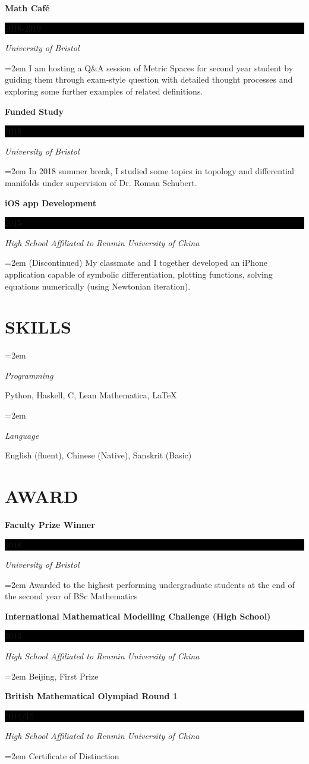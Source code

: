\documentclass[paper=a4,fontsize=11pt]{scrartcl} %
\newlength{\spacebox}
\newcommand{\sepspace}{\vspace*{1em}}		%
\newcommand{\NewPart}[1]{\section*{\uppercase{#1}}}
\newcommand{\PersonalEntry}[2]{
		\noindent\hangindent=2em\hangafter=0 %
		\parbox{\spacebox}{        %
		\textit{#1}}		       %
		\hspace{1.5em} #2 \par}    %
\newcommand{\SkillsEntry}[2]{      %
		\noindent\hangindent=2em\hangafter=0 %
		\parbox{\spacebox}{        %
		\textit{#1}}			   %
		\hspace{1.5em} #2 \par}    %
\newcommand{\EducationEntry}[4]{
		\noindent \textbf{#1} \hfill      %
		\colorbox{Black}{%
			\parbox{6em}{%
			\hfill\color{White}#2}} \par  %
		\noindent \textit{#3} \par        %
		\noindent\hangindent=2em\hangafter=0 \small #4 %
		\normalsize \par}
\begin{document}
\EducationEntry{Math Caf\'e}{2018-2019}{University of Bristol}{I am hosting a Q\&A session of Metric Spaces for second year student by guiding them through exam-style question with detailed thought processes and exploring some further examples of related definitions.}
\sepspace

\EducationEntry{Funded Study}{2018}{University of Bristol}{In 2018 summer break, I studied some topics in topology and differential manifolds under supervision of Dr. Roman Schubert.}
\sepspace

\EducationEntry{iOS app Development}{2015}{High School Affiliated to Renmin University of China}{(Discontinued) My classmate and I together developed an iPhone application capable of symbolic differentiation, plotting functions, solving equations numerically (using Newtonian iteration).}

\NewPart{Skills}{}

\SkillsEntry{Programming}{Python, Haskell, C, Lean Mathematica, LaTeX}
\SkillsEntry{Language}{English  (fluent), Chinese (Native), Sanskrit (Basic)}

\NewPart{Award}{}

\EducationEntry{Faculty Prize Winner}{2018}{University of Bristol}{Awarded to the highest performing undergraduate students at the end of the second year of BSc Mathematics}
\EducationEntry{International Mathematical Modelling Challenge (High School)}{2015}{High School Affiliated to Renmin University of China}{Beijing, First Prize}
\EducationEntry{British Mathematical Olympiad Round 1}{2014/15}{High School Affiliated to Renmin University of China}{Certificate of Distinction}
\end{document}
